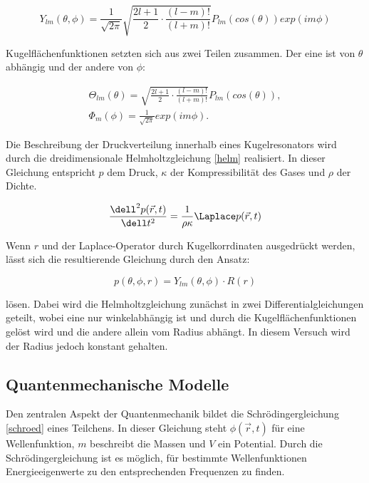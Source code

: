 \begin{equation}
    Y_{lm}(\theta,\phi) = \frac{1}{\sqrt{2\pi}} \sqrt{\frac{2l+1}{2}\cdot \frac{(l-m)!}{(l+m)!}} P_{lm}(cos(\theta))exp(im\phi)
    \label{kugel}
\end{equation}

Kugelflächenfunktionen setzten sich aus zwei Teilen zusammen. Der eine ist von $\theta$ 
abhängig und der andere von $\phi$:

\begin{align}
    \Theta_{lm}(\theta) = \sqrt{\frac{2l+1}{2}\cdot \frac{(l-m)!}{(l+m)!}} P_{lm}(cos(\theta)),\\
    \Phi_{m}(\phi) = \frac{1}{\sqrt{2\pi}} exp(im\phi).
\end{align}

Die Beschreibung der Druckverteilung innerhalb eines Kugelresonators wird durch die 
dreidimensionale Helmholtzgleichung \ref{helm} realisiert. In dieser Gleichung 
entspricht $p$ dem Druck, $\kappa$ der Kompressibilität des Gases und $\rho$ der Dichte.

\begin{equation}
    \frac{\dell^2 p(\vec{r},t)}{\dell t^2} = \frac{1}{\rho \kappa}  \Laplace p(\vec{r},t)
    \label{helm}
\end{equation}

Wenn $r$ und der Laplace-Operator durch Kugelkorrdinaten ausgedrückt werden, lässt 
sich die resultierende Gleichung durch den Ansatz:

\begin{equation}
    p(\theta,\phi,r)= Y_{lm}(\theta,\phi) \cdot R(r)
    \label{druckprodukt}
\end{equation}

lösen. Dabei wird die Helmholtzgleichung zunächst in zwei Differentialgleichungen 
geteilt, wobei eine nur winkelabhängig ist und durch die Kugelflächenfunktionen 
gelöst wird und die andere allein vom Radius abhängt. In diesem Versuch wird 
der Radius jedoch konstant gehalten.

\subsection{Quantenmechanische Modelle}
Den zentralen Aspekt der Quantenmechanik bildet die Schrödingergleichung \ref{schroed}
eines Teilchens. In dieser Gleichung steht $\phi(\vec{r},t)$ für eine Wellenfunktion,
$m$ beschreibt die Massen und $V$ ein Potential.
Durch die Schrödingergleichung ist
es möglich, für bestimmte Wellenfunktionen Energieeigenwerte zu den 
entsprechenden Frequenzen zu finden. 

